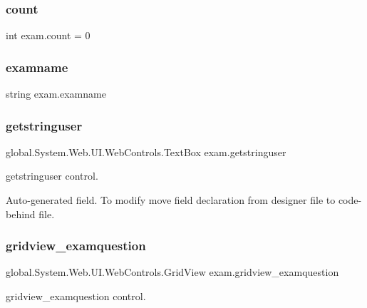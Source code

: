 \subsubsection{\texorpdfstring{count}{count}}
{\footnotesize\ttfamily int exam.\+count = 0\hspace{0.3cm}{\ttfamily [private]}}

\mbox{\label{classexam_a8cc8fbb089450d018a07155af84532fb}} 
\subsubsection{\texorpdfstring{examname}{examname}}
{\footnotesize\ttfamily string exam.\+examname\hspace{0.3cm}{\ttfamily [private]}}

\mbox{\label{classexam_aef16f5e026d3e9953f75ab4300c14746}} 
\subsubsection{\texorpdfstring{getstringuser}{getstringuser}}
{\footnotesize\ttfamily global.\+System.\+Web.\+U\+I.\+Web\+Controls.\+Text\+Box exam.\+getstringuser\hspace{0.3cm}{\ttfamily [protected]}}



getstringuser control. 

Auto-\/generated field. To modify move field declaration from designer file to code-\/behind file. \mbox{\label{classexam_a9c8a262201b7134210c2d7a6b185f227}} 
\subsubsection{\texorpdfstring{gridview\_examquestion}{gridview\_examquestion}}
{\footnotesize\ttfamily global.\+System.\+Web.\+U\+I.\+Web\+Controls.\+Grid\+View exam.\+gridview\+\_\+examquestion\hspace{0.3cm}{\ttfamily [protected]}}



gridview\+\_\+examquestion control. 

